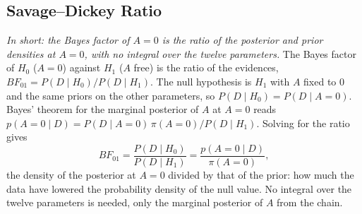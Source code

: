 \begin{table}[h]
\centering
{}
\caption{Equal-tailed and highest-posterior-density $68\%$ intervals and skewness of the marginal posteriors.}
\label{tab:checks_hpd}
\end{table}

\subsection{Savage--Dickey Ratio}
\label{sec:appendix_sd}
\emph{In short: the Bayes factor of $A=0$ is the ratio of the posterior and prior densities at $A=0$, with no integral over the twelve parameters.}
The Bayes factor of $H_0$ ($A=0$) against $H_1$ ($A$ free) is the ratio of the evidences, $BF_{01}=P(D\mid H_0)/P(D\mid H_1)$. The null hypothesis is $H_1$ with $A$ fixed to $0$ and the same priors on the other parameters, so $P(D\mid H_0)=P(D\mid A=0)$. Bayes' theorem for the marginal posterior of $A$ at $A=0$ reads $p(A=0\mid D)=P(D\mid A=0)\,\pi(A=0)/P(D\mid H_1)$. Solving for the ratio gives
\[
BF_{01}=\frac{P(D\mid H_0)}{P(D\mid H_1)}=\frac{p(A=0\mid D)}{\pi(A=0)},
\]
the density of the posterior at $A=0$ divided by that of the prior: how much the data have lowered the probability density of the null value. No integral over the twelve parameters is needed, only the marginal posterior of $A$ from the chain.


